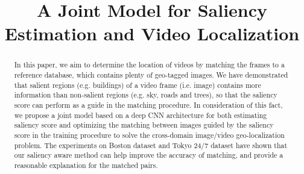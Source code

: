 \documentclass[sigconf, review=true, anonymous=true]{acmart}
\begin{document}
\title{A Joint Model for Saliency Estimation and Video Localization}


\begin{abstract}
\par
In this paper, we aim to determine the location of videos by matching the frames to a reference database, which contains plenty of geo-tagged images. We have demonstrated that salient regions (e.g. buildings) of a video frame (i.e. image) contains more information than non-salient regions (e.g. sky, roads and trees), so that the saliency score can perform as a guide in the matching procedure. In consideration of this fact, we propose a joint model based on a deep CNN architecture for both estimating saliency score and optimizing the matching between images guided by the saliency score in the training procedure to solve the cross-domain image/video geo-localization problem. The experiments on Boston dataset and Tokyo 24/7 dataset have shown that our saliency aware method can help improve the accuracy of matching, and provide a reasonable explanation for the matched pairs. 
\end{abstract}


\maketitle



\newpage

 
\end{document}

